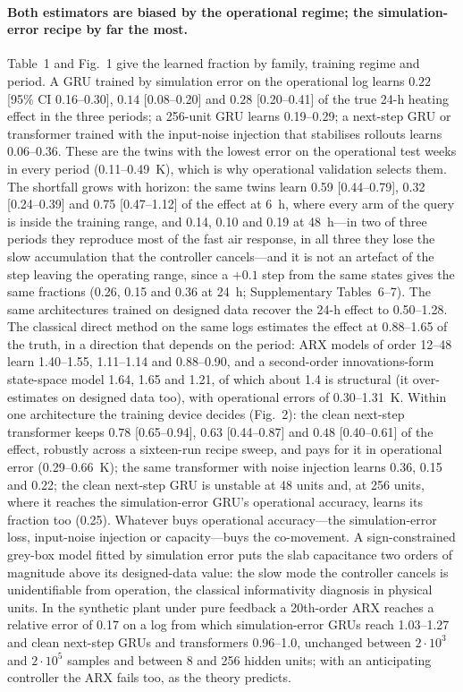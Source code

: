 \documentclass[11pt]{article}
\begin{document}
\paragraph{Both estimators are biased by the operational regime; the simulation-error recipe by far the most.} Table~1 and Fig.~1 give the learned fraction by family, training regime and period. A GRU trained by simulation error on the operational log learns $0.22$ [95\% CI 0.16--0.30], $0.14$ [0.08--0.20] and $0.28$ [0.20--0.41] of the true 24-h heating effect in the three periods; a 256-unit GRU learns 0.19--0.29; a next-step GRU or transformer trained with the input-noise injection that stabilises rollouts learns 0.06--0.36. These are the twins with the lowest error on the operational test weeks in every period (0.11--0.49~K), which is why operational validation selects them. The shortfall grows with horizon: the same twins learn 0.59 [0.44--0.79], 0.32 [0.24--0.39] and 0.75 [0.47--1.12] of the effect at 6~h, where every arm of the query is inside the training range, and 0.14, 0.10 and 0.19 at 48~h---in two of three periods they reproduce most of the fast air response, in all three they lose the slow accumulation that the controller cancels---and it is not an artefact of the step leaving the operating range, since a $+0.1$ step from the same states gives the same fractions (0.26, 0.15 and 0.36 at 24~h; Supplementary Tables~6--7). The same architectures trained on designed data recover the 24-h effect to 0.50--1.28. The classical direct method on the same logs estimates the effect at 0.88--1.65 of the truth, in a direction that depends on the period: ARX models of order 12--48 learn 1.40--1.55, 1.11--1.14 and 0.88--0.90, and a second-order innovations-form state-space model 1.64, 1.65 and 1.21, of which about 1.4 is structural (it over-estimates on designed data too), with operational errors of 0.30--1.31~K. Within one architecture the training device decides (Fig.~2): the clean next-step transformer keeps $0.78$ [0.65--0.94], $0.63$ [0.44--0.87] and $0.48$ [0.40--0.61] of the effect, robustly across a sixteen-run recipe sweep, and pays for it in operational error (0.29--0.66~K); the same transformer with noise injection learns 0.36, 0.15 and 0.22; the clean next-step GRU is unstable at 48 units and, at 256 units, where it reaches the simulation-error GRU's operational accuracy, learns its fraction too (0.25). Whatever buys operational accuracy---the simulation-error loss, input-noise injection or capacity---buys the co-movement. A sign-constrained grey-box model fitted by simulation error puts the slab capacitance two orders of magnitude above its designed-data value: the slow mode the controller cancels is unidentifiable from operation, the classical informativity diagnosis in physical units. In the synthetic plant under pure feedback a 20th-order ARX reaches a relative error of 0.17 on a log from which simulation-error GRUs reach 1.03--1.27 and clean next-step GRUs and transformers 0.96--1.0, unchanged between $2{\cdot}10^3$ and $2{\cdot}10^5$ samples and between 8 and 256 hidden units; with an anticipating controller the ARX fails too, as the theory predicts.
\end{document}

